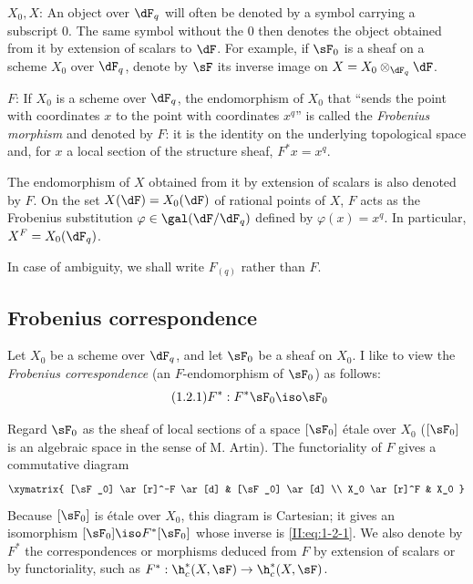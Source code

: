 $X_0,X$: An object over $\dF_q$ will often be denoted by a symbol carrying a
subscript $0$. The same symbol without the $0$ then denotes the object
obtained from it by extension of scalars to $\dF$. For example, if $\sF_0$ is
a sheaf on a scheme $X_0$ over $\dF_q$, denote by $\sF$ its inverse image on
$X=X_0\otimes_{\dF_q} \dF$.

$F$: If $X_0$ is a scheme over $\dF_q$, the endomorphism of $X_0$ that
``sends the point with coordinates $x$ to the point with coordinates $x^q$''
is called the \emph{Frobenius morphism} and denoted by $F$: it is the identity
on the underlying topological space and, for $x$ a local section of the
structure sheaf, $F^* x = x^q$.

The endomorphism of $X$ obtained from it by extension of scalars is also
denoted by $F$. On the set $X(\dF) = X_0(\dF)$ of rational points of $X$,
$F$ acts as the Frobenius substitution
$\varphi\in\gal(\dF/\dF_q)$ defined by $\varphi(x)=x^q$. In particular,
$X^F=X_0(\dF_q)$.

In case of ambiguity, we shall write $F_{(q)}$ rather than $F$.










\subsection{Frobenius correspondence}\label{II:1-2}

Let $X_0$ be a scheme over $\dF_q$, and let $\sF_0$ be a sheaf on $X_0$. I
like to view the \emph{Frobenius correspondence} (an $F$-endomorphism of
$\sF_0$) as follows:
\begin{equation*}\tag{1.2.1}\label{II:eq:1-2-1}
  F^* : F^*\sF_0 \iso \sF_0
\end{equation*}

Regard $\sF_0$ as the sheaf of local sections of a space $[\sF_0]$ étale over
$X_0$ ($[\sF_0]$ is an algebraic space in the sense of M. Artin). The
functoriality of $F$ gives a commutative diagram
\[\xymatrix{
  [\sF_0] \ar[r]^-F \ar[d]
    & [\sF_0] \ar[d] \\
  X_0 \ar[r]^F
    & X_0
}\]
Because $[\sF_0]$ is étale over $X_0$, this diagram is Cartesian; it gives an
isomorphism $[\sF_0]\iso F^*[\sF_0]$ whose inverse is
\eqref{II:eq:1-2-1}. We also denote by $F^*$ the correspondences or morphisms
deduced from $F$ by extension of scalars or by functoriality, such as
$F^*:\h_c^*(X,\sF)\to \h_c^*(X,\sF)$.

